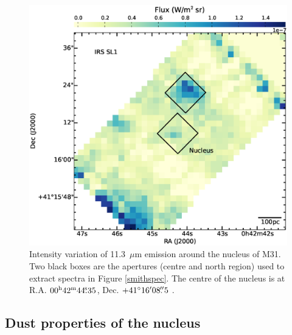 %
\begin{figure}
\centering
\includegraphics[width = 8 cm]{./nuc11_3.eps}
\caption{ Intensity variation of 11.3~$\mu$m emission around the nucleus of M31. 
Two black boxes are the apertures (centre and north region) used to extract spectra in Figure \ref{smithspec}. 
The centre of the nucleus is at R.A. $00^{\rm h}42^{\rm m}44\fs35$, Dec. $+41\hbox{$^\circ$}16\hbox{$^\prime$}08\hbox{$.\!\!^{\prime\prime}$}5$ \citep{NucleusREF}.}
\label{nuc11}
\end{figure}

\subsection{Dust properties of the nucleus}
\label{sect:nucleus}


%

